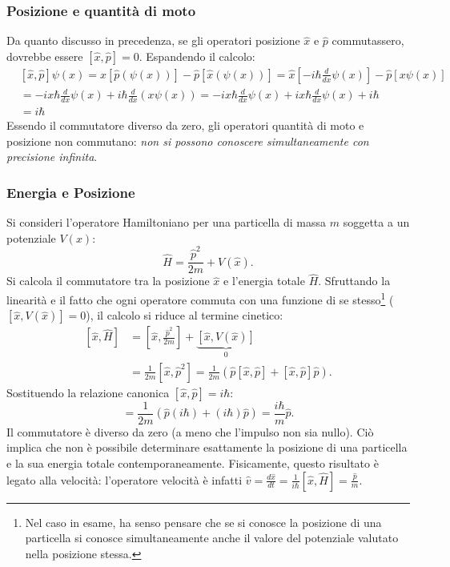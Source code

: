 \documentclass[a4paper,11pt]{report}
\begin{document}
\subsubsection{Posizione e quantità di moto}
Da quanto discusso in precedenza, se gli operatori posizione $\hat{x}$ e $\hat{p}$ commutassero, dovrebbe essere $[\hat{x}, \hat{p}] = 0$. Espandendo il calcolo:
\begin{equation}
\begin{aligned}
   &[\hat{x}, \hat{p}]\psi(x) = \hat{x}[\hat{p}(\psi(x))] - \hat{p}[\hat{x}(\psi(x))] = \hat{x}\left[-i\hbar\frac{d}{dx}\psi(x)\right] - \hat{p}[x\psi(x)] \\
  &= -ix\hbar\frac{d}{dx}\psi(x) + i\hbar\frac{d}{dx}(x\psi(x)) =  -ix\hbar\frac{d}{dx}\psi(x) + ix\hbar\frac{d}{dx}\psi(x) + i\hbar  \\&= i\hbar
   \end{aligned}
\end{equation}
Essendo il commutatore diverso da zero, gli operatori quantità di moto e posizione non commutano: \textit{non si possono conoscere simultaneamente con precisione infinita}.

\subsubsection{Energia e Posizione}
Si consideri l'operatore Hamiltoniano per una particella di massa $m$ soggetta a un potenziale $V(x)$:
\begin{equation}
    \hat{H} = \frac{\hat{p}^2}{2m} + V(\hat{x}).
\end{equation}
Si calcola il commutatore tra la posizione $\hat{x}$ e l'energia totale $\hat{H}$. Sfruttando la linearità e il fatto che ogni operatore commuta con una funzione di se stesso\footnote{Nel caso in esame, ha senso pensare che se si conosce la posizione di una particella si conosce simultaneamente anche il valore del potenziale valutato nella posizione stessa.} ($[\hat{x}, V(\hat{x})] = 0$), il calcolo si riduce al termine cinetico:
\begin{equation}
\begin{aligned}
    [\hat{x}, \hat{H}] &= \left[ \hat{x}, \frac{\hat{p}^2}{2m} \right] + \underbrace{[\hat{x}, V(\hat{x})]}_{0} \\
    &= \frac{1}{2m} [\hat{x}, \hat{p}^2] = \frac{1}{2m} \left( \hat{p}[\hat{x}, \hat{p}] + [\hat{x}, \hat{p}]\hat{p} \right).
\end{aligned}
\end{equation}
Sostituendo la relazione canonica $[\hat{x}, \hat{p}] = i\hbar$:
\begin{equation}
    [\hat{x}, \hat{H}] = \frac{1}{2m} ( \hat{p}(i\hbar) + (i\hbar)\hat{p} ) = \frac{i\hbar}{m}\hat{p}.
\end{equation}
Il commutatore è diverso da zero (a meno che l'impulso non sia nullo). Ciò implica che non è possibile determinare esattamente la posizione di una particella e la sua energia totale contemporaneamente. Fisicamente, questo risultato è legato alla velocità: l'operatore velocità è infatti $\hat{v} = \frac{d\hat{x}}{dt} = \frac{1}{i\hbar}[\hat{x}, \hat{H}] = \frac{\hat{p}}{m}$.
\end{document}
